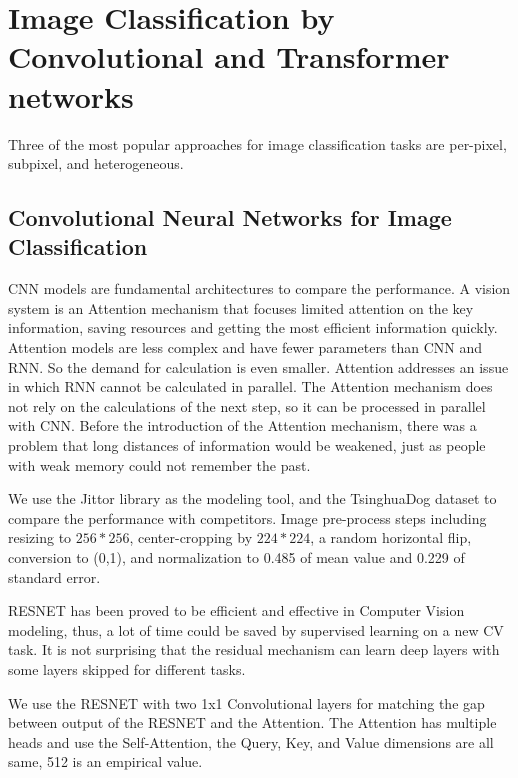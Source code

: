 \documentclass[runningheads]{llncs}
\begin{document}

\section{Image Classification by Convolutional and Transformer networks}

Three of the most popular approaches for image classification tasks are per-pixel, subpixel, and heterogeneous.

\subsection{Convolutional Neural Networks for Image Classification}

\par CNN models are fundamental architectures to compare the performance. A vision system is an Attention mechanism that focuses limited attention on the key information, saving resources and getting the most efficient information quickly.
Attention models are less complex and have fewer parameters than CNN and RNN. So the demand for calculation is even smaller.
Attention addresses an issue in which RNN cannot be calculated in parallel.
The Attention mechanism does not rely on the calculations of the next step, so it can be processed in parallel with CNN.
Before the introduction of the Attention mechanism, there was a problem that long distances of information would be weakened,
just as people with weak memory could not remember the past.

\par We use the Jittor\cite{hu2020jittor} library as the modeling tool, and the TsinghuaDog\cite{Zou2020ThuDogs} dataset to compare the performance with competitors.
Image pre-process steps including resizing to $256*256$, center-cropping by $224*224$, a random horizontal flip, conversion to (0,1), and normalization to 0.485 of mean value and 0.229 of standard error.

\par RESNET has been proved to be efficient and effective in Computer Vision modeling, thus, a lot of time could be saved by supervised learning on a new CV task.
It is not surprising that the residual mechanism can learn deep layers with some layers skipped for different tasks.

\par We use the RESNET with two 1x1 Convolutional layers for matching the gap between output of the RESNET and the Attention.
The Attention has multiple heads and use the Self-Attention, the Query, Key, and Value dimensions are all same, 512 is an empirical value.
\end{document}
